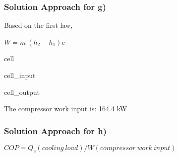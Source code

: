 \documentclass[letterpaper,10pt,english]{jupyterBook}
\begin{document}
\subsubsection{Solution Approach for g)}
\label{\detokenize{notebooks/Chapter5/CH5-Q8:solution-approach-for-g}}
\sphinxAtStartPar
Based on the first law,

\sphinxAtStartPar
\(\dot W= \dot m\:(h_2-h_1)\)e

\begin{sphinxuseclass}{cell}\begin{sphinxVerbatimInput}

\begin{sphinxuseclass}{cell_input}
\begin{sphinxVerbatim}[commandchars=\\\{\}]
         
 
\end{sphinxVerbatim}

\end{sphinxuseclass}\end{sphinxVerbatimInput}
\begin{sphinxVerbatimOutput}

\begin{sphinxuseclass}{cell_output}
\begin{sphinxVerbatim}[commandchars=\\\{\}]
The compressor work input is: 164.4 kW
\end{sphinxVerbatim}

\end{sphinxuseclass}\end{sphinxVerbatimOutput}

\end{sphinxuseclass}

\subsubsection{Solution Approach for h)}
\label{\detokenize{notebooks/Chapter5/CH5-Q8:solution-approach-for-h}}
\sphinxAtStartPar
\(COP = Q_c(cooling\:load) / W(compressor\:work\:input)\)
\end{document}
